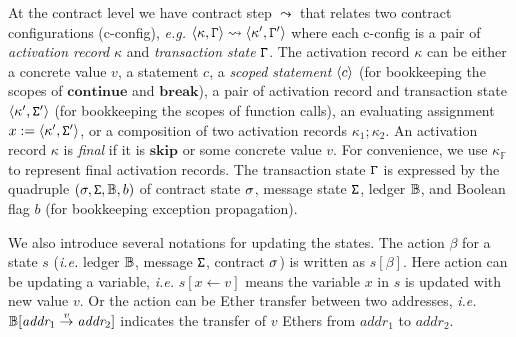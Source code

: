 At the contract level we have contract step $\leadsto$ that relates two contract configurations (c-config), \emph{e.g.} $\langle \kappa,\mathtt{\Gamma} \rangle \leadsto \langle \kappa',\mathtt{\Gamma}' \rangle$ where each c-config is a pair of \emph{activation record} $\kappa$ and \emph{transaction state} $\mathtt{\Gamma}$. The activation record $\kappa$ can be either a concrete value $v$, a statement $c$, a \emph{scoped statement} $\langle c \rangle$ (for bookkeeping the scopes of $\textbf{continue}$ and $\textbf{break}$), a pair of activation record and transaction state $\langle \kappa',\mathtt{\Sigma}' \rangle$ (for bookkeeping the scopes of function calls), an evaluating assignment $x:= \langle \kappa',\mathtt{\Sigma}' \rangle$, or a composition of two activation records $\kappa_1;\kappa_2$. An activation record $\kappa$ is \emph{final} if it is $\textbf{skip}$ or some concrete value $v$. For convenience, we use $\kappa_{\mathbb{F}}$ to represent final activation records. The transaction state $\mathtt{\Gamma}$ is expressed by the quadruple $(\sigma,\mathtt{\Sigma},\mathbb{B},b)$ of contract state $\sigma$, message state $\mathtt{\Sigma}$, ledger $\mathbb{B}$, and Boolean flag $b$ (for bookkeeping exception propagation).


We also introduce several notations for updating the states. The action $\beta$ for a state $s$ (\emph{i.e.} ledger $\mathbb{B}$, message $\mathtt{\Sigma}$, contract $\sigma$) is written as $s[\beta]$. Here action can be updating a variable, \emph{i.e.} $s[x \leftarrow v]$ means the variable $x$ in $s$ is updated with new value $v$. Or the action can be Ether transfer between two addresses, \emph{i.e.} $\mathbb{B}[\textit{addr}_1 \stackrel{v}{\rightarrow} \textit{addr}_2]$ indicates the transfer of $v$ Ethers from $\textit{addr}_1$ to $\textit{addr}_2$. 

